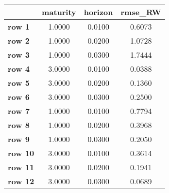 \begin{tiny}\begin{tabular}{|l|c|c|c|}
\hline
&\textbf{maturity}&\textbf{horizon}&\textbf{rmse_RW}\\\hline
\textbf{row 1}&1.0000&0.0100&0.6073\\\hline
\textbf{row 2}&1.0000&0.0200&1.0728\\\hline
\textbf{row 3}&1.0000&0.0300&1.7444\\\hline
\textbf{row 4}&3.0000&0.0100&0.0388\\\hline
\textbf{row 5}&3.0000&0.0200&0.1360\\\hline
\textbf{row 6}&3.0000&0.0300&0.2500\\\hline
\textbf{row 7}&1.0000&0.0100&0.7794\\\hline
\textbf{row 8}&1.0000&0.0200&0.3968\\\hline
\textbf{row 9}&1.0000&0.0300&0.2050\\\hline
\textbf{row 10}&3.0000&0.0100&0.3614\\\hline
\textbf{row 11}&3.0000&0.0200&0.1941\\\hline
\textbf{row 12}&3.0000&0.0300&0.0689\\\hline
\end{tabular}
\end{tiny}